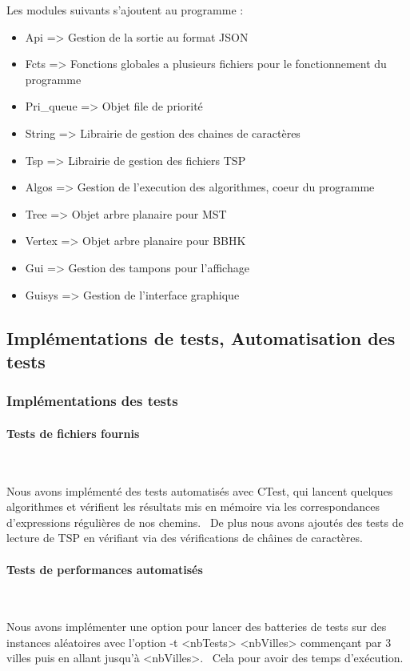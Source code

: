 \documentclass[12pt]{report}
\begin{document}
{{{{{{{Les modules suivants s'ajoutent au programme :
\begin{itemize}
\item Api => Gestion de la sortie au format JSON
\item Fcts => Fonctions globales a plusieurs fichiers pour le fonctionnement du programme
\item Pri\_queue => Objet file de priorité
\item String => Librairie de gestion des chaines de caractères
\item Tsp => Librairie de gestion des fichiers TSP
\item Algos => Gestion de l'execution des algorithmes, coeur du programme 
\item Tree => Objet arbre planaire pour MST
\item Vertex => Objet arbre planaire pour BBHK
\item Gui => Gestion des tampons pour l'affichage
\item Guisys => Gestion de l'interface graphique
\end{itemize}


\subsection{Implémentations de tests, Automatisation des tests}

\subsubsection{Implémentations des tests}

\paragraph{Tests de fichiers fournis} \

Nous avons implémenté des tests automatisés avec CTest, qui lancent quelques algorithmes et vérifient les résultats mis en mémoire via les correspondances d'expressions régulières de nos chemins. \
De plus nous avons ajoutés des tests de lecture de TSP en vérifiant via des vérifications de châines de caractères.

\paragraph{Tests de performances automatisés} \

Nous avons implémenter une option pour lancer des batteries de tests sur des instances aléatoires avec l'option -t <nbTests> <nbVilles> commençant par 3 villes puis en allant jusqu'à <nbVilles>. \
Cela pour avoir des temps d'exécution.

}}}}}}}
\end{document}
